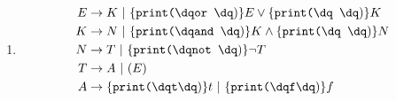 \documentclass[a4paper,10pt]{scrartcl}
\begin{document}
\begin{enumerate}
\begin{center}
{{{                        
                    }
                    \TR*{$\land$}
                }
            }
        \end{center}
 \item  \begin{align*}
            E &\to K\ |\ \print{or } E \lor\print{ } K \\
            K &\to N\ |\ \print{and } K \land\print{ } N \\
            N &\to T\ |\ \print{not } \neg T\\
            T &\to A\ |\ (E)\\
            A &\to \print{t} t\ |\ \print{f} f
        \end{align*}
\end{enumerate}
\end{document}
